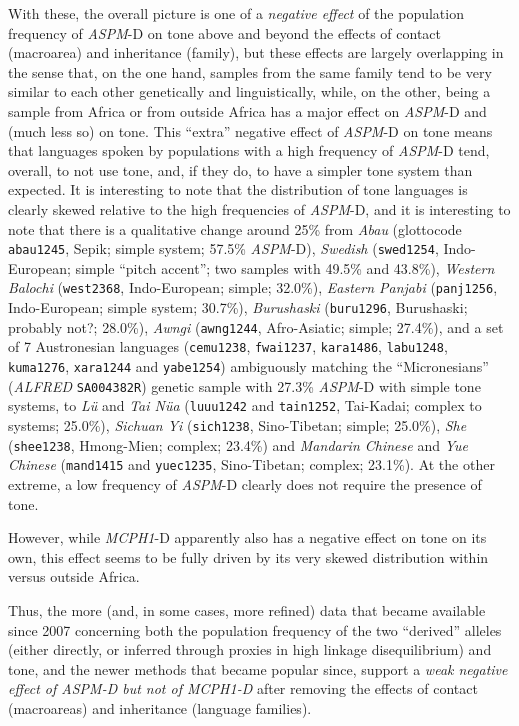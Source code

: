 \documentclass[twoside,onecolumn]{article}
\begin{document}
With these, the overall picture is one of a \emph{negative effect} of the population frequency of \textit{ASPM}-D on tone above and beyond the effects of contact (macroarea) and inheritance (family), but these effects are largely overlapping in the sense that, on the one hand, samples from the same family tend to be very similar to each other genetically and linguistically, while, on the other, being a sample from Africa or from outside Africa has a major effect on \textit{ASPM}-D and (much less so) on tone.
This ``extra'' negative effect of \textit{ASPM}-D on tone means that languages spoken by populations with a high frequency of \textit{ASPM}-D tend, overall, to not use tone, and, if they do, to have a simpler tone system than expected.
It is interesting to note that the distribution of tone languages is clearly skewed relative to the high frequencies of \textit{ASPM}-D, and it is interesting to note that there is a qualitative change around 25\% from \textit{Abau} (glottocode \texttt{abau1245}, Sepik; simple system; 57.5\% \textit{ASPM}-D), \textit{Swedish} (\texttt{swed1254}, Indo-European; simple ``pitch accent''; two samples with 49.5\% and 43.8\%), \textit{Western Balochi} (\texttt{west2368}, Indo-European; simple; 32.0\%), \textit{Eastern Panjabi} (\texttt{panj1256}, Indo-European; simple system; 30.7\%), \textit{Burushaski} (\texttt{buru1296}, Burushaski; probably not?; 28.0\%), \textit{Awngi} (\texttt{awng1244}, Afro-Asiatic; simple; 27.4\%), and a set of 7 Austronesian languages (\texttt{cemu1238}, \texttt{fwai1237}, \texttt{kara1486}, \texttt{labu1248}, \texttt{kuma1276}, \texttt{xara1244} and \texttt{yabe1254}) ambiguously matching the ``Micronesians'' (\textit{ALFRED} \texttt{SA004382R}) genetic sample with 27.3\% \textit{ASPM}-D with simple tone systems, to \textit{L\"{u}} and \textit{Tai N\"{u}a} (\texttt{luuu1242} and \texttt{tain1252}, Tai-Kadai; complex to systems; 25.0\%), \textit{Sichuan Yi} (\texttt{sich1238}, Sino-Tibetan; simple; 25.0\%), \textit{She} (\texttt{shee1238}, Hmong-Mien; complex; 23.4\%) and \textit{Mandarin Chinese} and \textit{Yue Chinese} (\texttt{mand1415} and \texttt{yuec1235}, Sino-Tibetan; complex; 23.1\%).
At the other extreme, a low frequency of \textit{ASPM}-D clearly does not require the presence of tone.

However, while \textit{MCPH1}-D apparently also has a negative effect on tone on its own, this effect seems to be fully driven by its very skewed distribution within versus outside Africa.

Thus, the more (and, in some cases, more refined) data that became available since 2007 concerning both the population frequency of the two ``derived'' alleles (either directly, or inferred through proxies in high linkage disequilibrium) and tone, and the newer methods that became popular since, support a \emph{weak negative effect of \textit{ASPM}-D but not of \textit{MCPH1}-D} after removing the effects of contact (macroareas) and inheritance (language families).
\end{document}
